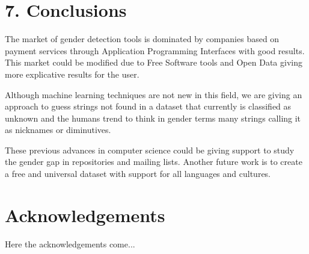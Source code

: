 \documentclass[a4paper]{article}
\begin{document}
\section*{7. Conclusions}

The market of gender detection tools is dominated by companies based
on payment services through Application Programming Interfaces with
good results. This market could be modified due to Free Software
tools and Open Data giving more explicative results for the user.

Although machine learning techniques are not new in this field, we
are giving an approach to guess strings not found in a dataset that
currently is classified as unknown and the humans trend to think in
gender terms many strings calling it as nicknames or diminutives.

These previous advances in computer science could be giving support to
study the gender gap in repositories and mailing lists. Another future
work is to create a free and universal dataset with support for all
languages and cultures.


\section*{Acknowledgements}

Here the acknowledgements come...

 

\end{document}
